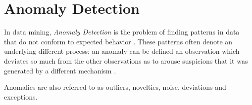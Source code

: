 \chapter{Anomaly Detection}

In data mining, \textit{Anomaly Detection} is the problem of finding patterns in data that do not conform to expected behavior \cite{chandola2009anomaly}. These patterns often denote an underlying different process: an anomaly can be defined an observation which deviates so much from the other observations as to arouse suspicions that it was generated by a different mechanism \cite{hawkins1980identification}.

Anomalies are also referred to as outliers, novelties, noise, deviations and exceptions.
